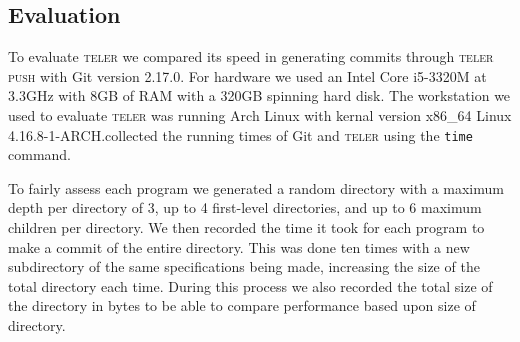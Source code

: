 \documentclass[12pt, letterpaper]{article}
\begin{document}
\begin{multicols}{2}
  \section{Evaluation}
  \label{sec:evaluation}
  To evaluate \textsc{teler} we compared its speed in generating
  commits through \textsc{teler push} with Git version 2.17.0. For
  hardware we used an Intel Core i5-3320M at 3.3GHz with 8GB of RAM
  with a 320GB spinning hard disk. The workstation we used to evaluate
  \textsc{teler} was running Arch Linux with kernal version x86\_64
  Linux 4.16.8-1-ARCH.\@We collected the running times of Git and
  \textsc{teler} using the \texttt{time} command.

  To fairly assess each program we generated a random directory with a
  maximum depth per directory of 3, up to 4 first-level directories,
  and up to 6 maximum children per directory. We then recorded the
  time it took for each program to make a commit of the entire
  directory. This was done ten times with a new subdirectory of the
  same specifications being made, increasing the size of the total
  directory each time. During this process we also recorded the total
  size of the directory in bytes to be able to compare performance
  based upon size of directory.



\end{multicols}
\end{document}
